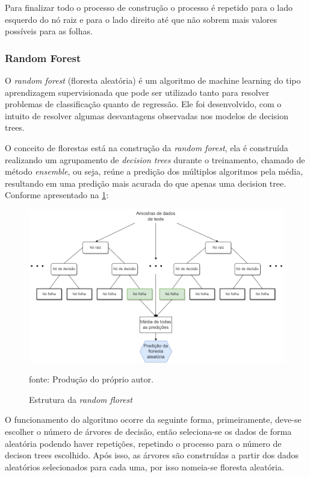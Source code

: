 \documentclass[
  12pt,		%
  a4paper,	%
  openright,%
  oneside,	%
  chapter=TITLE,		%
  section=TITLE,		%
  english,	%
  french,	%
  spanish,	%
  brazil	%
]{abntex2}
\begin{document}
    Para finalizar todo o processo de construção o processo é repetido para o lado esquerdo do nó raiz e para o lado direito até que não sobrem mais
    valores possíveis para as folhas.

    \subsubsection{Random Forest}

    O \textit{random forest} (floresta aleatória) é um algoritmo de machine learning do tipo aprendizagem 
    supervisionada que pode ser utilizado tanto para resolver problemas de classificação quanto de regressão. 
    Ele foi desenvolvido, com o intuito de resolver algumas desvantagens observadas nos modelos de decision trees.
    
    O conceito de florestas está na construção da \textit{random forest}, ela é construída realizando um agrupamento 
    de \textit{decision trees} durante o treinamento, chamado de método \textit{ensemble}, ou seja, reúne a predição 
    dos múltiplos algoritmos pela média, resultando em uma predição mais acurada do que apenas uma decision tree. 
    Conforme apresentado na \ref*{estrutura_random_florest}:

    \begin{figure}[h]
        \centering
        \caption{Estrutura da \textit{random florest}}
        \includegraphics[width=16cm]{../reports/figures/random_forest.png}
        \label{estrutura_random_florest}
        \par
        {\small fonte: Produção do próprio autor.}
    \end{figure}
    
    O funcionamento do algoritmo ocorre da seguinte forma, primeiramente, deve-se escolher o número de árvores de decisão, 
    então seleciona-se os dados de forma aleatória podendo haver repetições, repetindo o processo para o número de 
    decison trees escolhido. Após isso, as árvores são construídas a partir dos dados aleatórios selecionados para cada uma,
    por isso nomeia-se floresta aleatória.
\end{document}
